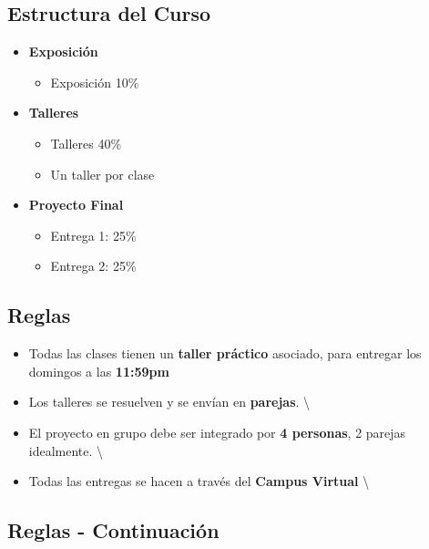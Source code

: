 \documentclass[
  letterpaper,
  DIV=11,
  numbers=noendperiod]{scrartcl}
\providecommand{\tightlist}{%
  \setlength{\itemsep}{0pt}\setlength{\parskip}{0pt}}
\begin{document}
\subsection{Estructura del Curso}\label{estructura-del-curso}

\begin{itemize}
\tightlist
\item
  \textbf{Exposición}

  \begin{itemize}
  \tightlist
  \item
    Exposición 10\%
  \end{itemize}
\item
  \textbf{Talleres}

  \begin{itemize}
  \tightlist
  \item
    Talleres 40\%
  \item
    Un taller por clase
  \end{itemize}
\item
  \textbf{Proyecto Final}

  \begin{itemize}
  \tightlist
  \item
    Entrega 1: 25\%
  \item
    Entrega 2: 25\%
  \end{itemize}
\end{itemize}

\subsection{Reglas}\label{reglas}

\begin{itemize}
\tightlist
\item
  Todas las clases tienen un \textbf{taller práctico} asociado, para
  entregar los domingos a las \textbf{11:59pm}
\item
  Los talleres se resuelven y se envían en \textbf{parejas}.
  \textbackslash{}
\item
  El proyecto en grupo debe ser integrado por \textbf{4 personas}, 2
  parejas idealmente. \textbackslash{}
\item
  Todas las entregas se hacen a través del \textbf{Campus Virtual}
  \textbackslash{}
\end{itemize}

\subsection{Reglas - Continuación}\label{reglas---continuaciuxf3n}
\end{document}
